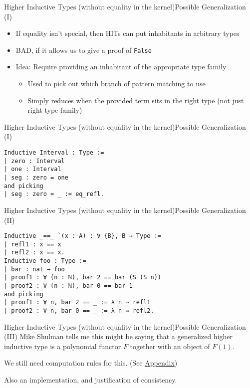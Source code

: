 \documentclass{beamer}
\begin{document}
\begin{frame}{Higher Inductive Types (without equality in the kernel)}{Possible Generalization (I)}
  \Large
  \begin{itemize}
    \item If equality isn't special, then HITs can put inhabitants in arbitrary types
    \item BAD, if it allows us to give a proof of \texttt{False}
    \item Idea: Require providing an inhabitant of the appropriate type family \pause
      \begin{itemize} \large
        \item Used to pick out which branch of pattern matching to use \pause
        \item Simply reduces when the provided term sits in the right type (not just right type family)
      \end{itemize}
  \end{itemize}
\end{frame}

\begin{frame}[fragile]{Higher Inductive Types (without equality in the kernel)}{Possible Generalization (I)}
  \Large
\begin{verbatim}
Inductive Interval : Type :=
| zero : Interval
| one : Interval
| seg : zero = one
and picking
| seg : zero = _ := eq_refl.
\end{verbatim}
\end{frame}

\begin{frame}[fragile]{Higher Inductive Types (without equality in the kernel)}{Possible Generalization (II)}
  \Large
\begin{verbatim}
Inductive _==_ `(x : A) : ∀ {B}, B → Type :=
| refl1 : x == x
| refl2 : x == x.
Inductive foo : Type :=
| bar : nat → foo
| proof1 : ∀ (n : ℕ), bar 2 == bar (S (S n))
| proof2 : ∀ (n : ℕ), bar 0 == bar 1
and picking
| proof1 : ∀ n, bar 2 == _ := λ n ⇒ refl1
| proof2 : ∀ n, bar 0 == _ := λ n ⇒ refl2.
\end{verbatim}
\end{frame}

\begin{frame}{Higher Inductive Types (without equality in the kernel)}{Possible Generalization (III)}
  \Large
  Mike Shulman tells me this might be saying that a generalized higher inductive type is a polynomial functor $F$ together with an object of $F(1)$. \pause
  
  We still need computation rules for this.  \pause (See \hyperref[sec:comp-hit]{Appendix}) \pause
  
  Also an implementation, and justification of consistency.
\end{frame}
\end{document}
